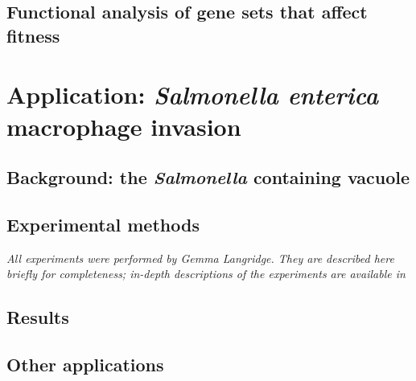 \subsection{Functional analysis of gene sets that affect fitness}

\section{Application: \textit{Salmonella enterica} macrophage invasion}

\subsection{Background: the {\it Salmonella} containing vacuole}

\subsection{Experimental methods}

\textit{All experiments were performed by Gemma Langridge. They are described here briefly for completeness; in-depth descriptions of the experiments are available in \parencite{Langridge2010}}


\subsection{Results}

\subsection{Other applications}